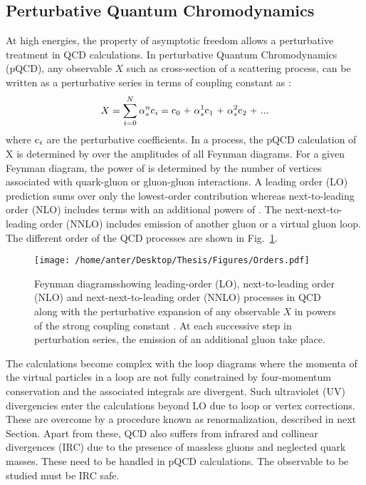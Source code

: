\subsection{Perturbative Quantum Chromodynamics}
At high energies, the property of asymptotic freedom allows a perturbative treatment in QCD calculations. In perturbative Quantum Chromodynamics (pQCD), any observable $X$ such as cross-section of a scattering process, can be written as a perturbative series in terms of coupling constant \alps as : 
\begin{equation}
X = \sum\limits_{i=0}^{N} \alpha^n_s {\rm c}_i = {\rm c}_0~\plus \alpha^1_s {\rm c}_1~\plus \alpha^2_s {\rm c}_2~\plus ...
\end{equation} 
where ${\rm c}_i$ are the perturbative coefficients. In a process, the pQCD calculation of X is determined by over the amplitudes of all Feynman diagrams. For a given Feynman diagram, the power of \alps is determined by the number of vertices associated with quark-gluon or gluon-gluon interactions. A leading order (LO) prediction sums over only the lowest-order contribution whereas next-to-leading order (NLO) includes terms with an additional powers of \alps. The next-next-to-leading order (NNLO) includes emission of another gluon or a virtual gluon loop. The different order of the QCD processes are shown in Fig.~\ref{fig:orders}.
\begin{figure}[!h]
\begin{center}
\hspace*{-1mm}
\texttt{[image: /home/anter/Desktop/Thesis/Figures/Orders.pdf]}\\
\vspace*{4mm}
\caption[Feyn]{Feynman diagrams\footnotemark showing leading-order (LO), next-to-leading order (NLO) and next-next-to-leading order (NNLO) processes in QCD along with the perturbative expansion of any observable $X$ in powers of the strong coupling constant \alps. At each successive step in perturbation series, the emission of an additional gluon take place.}
\label{fig:orders}
\end{center}
\end{figure}
The calculations become complex with the loop diagrams where the momenta of the virtual particles in a loop are not fully constrained by four-momentum conservation and the associated integrals are divergent. Such ultraviolet (UV) divergencies enter the calculations beyond LO due to loop or vertex corrections. These are overcome by a procedure known as renormalization, described in next Section. Apart from these, QCD also suffers from infrared and collinear divergences (IRC) due to the presence of massless gluons and neglected quark masses. These need to be handled in pQCD calculations. The observable to be studied must be IRC safe. 

